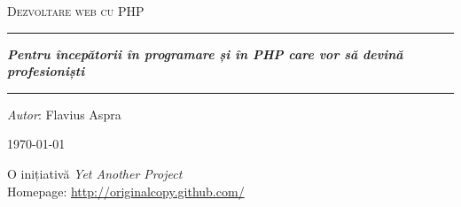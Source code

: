 \begin{titlepage}
\thispagestyle{empty}

\vspace*{10em}

\begin{center}
\textsc{\huge Dezvoltare web cu PHP}\\[5em]

\hrule

\vspace{3em}
\textit{\textbf{Pentru începătorii în programare și în PHP care vor să devină profesioniști}}
\vspace{3em}
\hrule
\vspace{8em}
\textit{Autor}: Flavius Aspra
\vspace{3em}

\today
\end{center}

\vfill

\begin{flushright}
\begin{Large}
O inițiativă \emph{Yet Another Project}\\
Homepage: \url{http://originalcopy.github.com/}
\end{Large}
\end{flushright}

\pagebreak
\end{titlepage}
